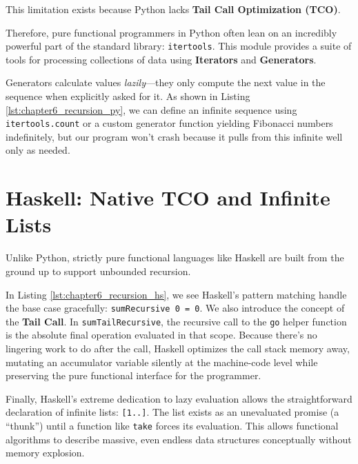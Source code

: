 This limitation exists because Python lacks \textbf{Tail Call Optimization (TCO)}. 

Therefore, pure functional programmers in Python often lean on an incredibly powerful part of the standard library: \texttt{itertools}. This module provides a suite of tools for processing collections of data using \textbf{Iterators} and \textbf{Generators}. 

Generators calculate values \textit{lazily}—they only compute the next value in the sequence when explicitly asked for it. As shown in Listing \ref{lst:chapter6_recursion_py}, we can define an infinite sequence using \texttt{itertools.count} or a custom generator function yielding Fibonacci numbers indefinitely, but our program won't crash because it pulls from this infinite well only as needed.

\section{Haskell: Native TCO and Infinite Lists}
Unlike Python, strictly pure functional languages like Haskell are built from the ground up to support unbounded recursion.



In Listing \ref{lst:chapter6_recursion_hs}, we see Haskell's pattern matching handle the base case gracefully: \texttt{sumRecursive 0 = 0}. We also introduce the concept of the \textbf{Tail Call}. In \texttt{sumTailRecursive}, the recursive call to the \texttt{go} helper function is the absolute final operation evaluated in that scope. Because there's no lingering work to do after the call, Haskell optimizes the call stack memory away, mutating an accumulator variable silently at the machine-code level while preserving the pure functional interface for the programmer.

Finally, Haskell's extreme dedication to lazy evaluation allows the straightforward declaration of infinite lists: \texttt{[1..]}. The list exists as an unevaluated promise (a ``thunk'') until a function like \texttt{take} forces its evaluation. This allows functional algorithms to describe massive, even endless data structures conceptually without memory explosion.



